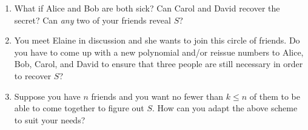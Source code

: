 \documentclass[12pt]{article}
\begin{document}
\begin{enumerate}
\begin{enumerate}
		\vfill

		\item What if Alice and Bob are both sick? Can Carol and David recover the secret? Can \textit{any} two of your friends reveal $S$?

		\vfill

		\item You meet Elaine in discussion and she wants to join this circle of friends. Do you have to come up with a new polynomial and/or reissue numbers to Alice, Bob, Carol, and David to ensure that three people are still necessary in order to recover $S$?

		\vfill

		\item Suppose you have $n$ friends and you want no fewer than $k\leq n$ of them to be able to come together to figure out $S$. How can you adapt the above scheme to suit your needs?

		\vfill
	\end{enumerate}
\end{enumerate}
\end{document}
